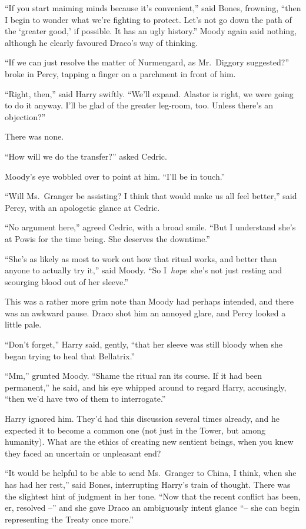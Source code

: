 ``If you start maiming minds because it's convenient,'' said Bones,
frowning, ``then I begin to wonder what we're fighting to protect. Let's
not go down the path of the `greater good,' if possible. It has an ugly
history.'' Moody again said nothing, although he clearly favoured
Draco's way of thinking.

``If we can just resolve the matter of Nurmengard, as Mr.~Diggory
suggested?'' broke in Percy, tapping a finger on a parchment in front of
him.

``Right, then,'' said Harry swiftly. ``We'll expand. Alastor is right,
we were going to do it anyway. I'll be glad of the greater leg-room,
too. Unless there's an objection?''

There was none.

``How will we do the transfer?'' asked Cedric.

Moody's eye wobbled over to point at him. ``I'll be in touch.''

``Will Ms.~Granger be assisting? I think that would make us all feel
better,'' said Percy, with an apologetic glance at Cedric.

``No argument here,'' agreed Cedric, with a broad smile. ``But I
understand she's at Powis for the time being. She deserves the
downtime.''

``She's as likely as most to work out how that ritual works, and better
than anyone to actually try it,'' said Moody. ``So I~\emph{hope}~she's
not just resting and scourging blood out of her sleeve.''

This was a rather more grim note than Moody had perhaps intended, and
there was an awkward pause. Draco shot him an annoyed glare, and Percy
looked a little pale.

``Don't forget,'' Harry said, gently, ``that her sleeve was still bloody
when she began trying to heal that Bellatrix.''

``Mm,'' grunted Moody. ``Shame the ritual ran its course. If it had been
permanent,'' he said, and his eye whipped around to regard Harry,
accusingly, ``then we'd have two of them to interrogate.''

Harry ignored him. They'd had this discussion several times already, and
he expected it to become a common one (not just in the Tower, but among
humanity). What are the ethics of creating new sentient beings, when you
knew they faced an uncertain or unpleasant end?

``It would be helpful to be able to send Ms.~Granger to China, I think,
when she has had her rest,'' said Bones, interrupting Harry's train of
thought. There was the slightest hint of judgment in her tone. ``Now
that the recent conflict has been, er, resolved --'' and she gave Draco
an ambiguously intent glance ``-- she can begin representing the Treaty
once more.''

